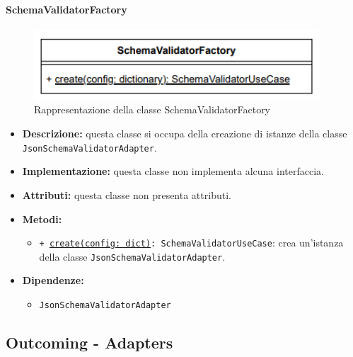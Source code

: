 \paragraph{SchemaValidatorFactory} \label{SchemaValidatorFactory}
\begin{figure}[H]
    \centering
    \includegraphics[width=0.95\textwidth]{assets/Backend/schema_validator_factory.png}
    \caption{Rappresentazione della classe SchemaValidatorFactory}
  \end{figure}
\begin{itemize}
    \item \textbf{Descrizione:} questa classe si occupa della creazione di istanze della classe \texttt{JsonSchemaValidatorAdapter}.
    \item \textbf{Implementazione:} questa classe non implementa alcuna interfaccia.
    \item \textbf{Attributi:} questa classe non presenta attributi.
    \item \textbf{Metodi:}
    \begin{itemize}
        \item \texttt{+ \underline{create(config: dict)}: SchemaValidatorUseCase}: crea un'istanza della classe \texttt{JsonSchemaValidatorAdapter}.
    \end{itemize}
    \item \textbf{Dipendenze:}
    \begin{itemize}
        \item \texttt{JsonSchemaValidatorAdapter}
    \end{itemize}
\end{itemize}  

\subsection{Outcoming - Adapters}

